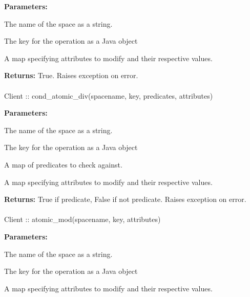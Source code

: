\noindent\textbf{Parameters:}
\begin{description}[labelindent=\widthof{{\code{attributes}}},leftmargin=*,noitemsep,nolistsep,align=right]
\item[\code{spacename}] The name of the space as a string.
\item[\code{key}] The key for the operation as a Java object
\item[\code{attributes}] A map specifying attributes to modify and their respective values.
\end{description}

\noindent\textbf{Returns:}
True.  Raises exception on error.

\paragraph{}
\label{api:java:cond_atomic_div}
\begin{javacode}
Client :: cond_atomic_div(spacename, key, predicates, attributes)
\end{javacode}


\noindent\textbf{Parameters:}
\begin{description}[labelindent=\widthof{{\code{predicates}}},leftmargin=*,noitemsep,nolistsep,align=right]
\item[\code{spacename}] The name of the space as a string.
\item[\code{key}] The key for the operation as a Java object
\item[\code{predicates}] A map of predicates to check against.
\item[\code{attributes}] A map specifying attributes to modify and their respective values.
\end{description}

\noindent\textbf{Returns:}
True if predicate, False if not predicate.  Raises exception on error.

\paragraph{}
\label{api:java:atomic_mod}
\begin{javacode}
Client :: atomic_mod(spacename, key, attributes)
\end{javacode}


\noindent\textbf{Parameters:}
\begin{description}[labelindent=\widthof{{\code{attributes}}},leftmargin=*,noitemsep,nolistsep,align=right]
\item[\code{spacename}] The name of the space as a string.
\item[\code{key}] The key for the operation as a Java object
\item[\code{attributes}] A map specifying attributes to modify and their respective values.
\end{description}

